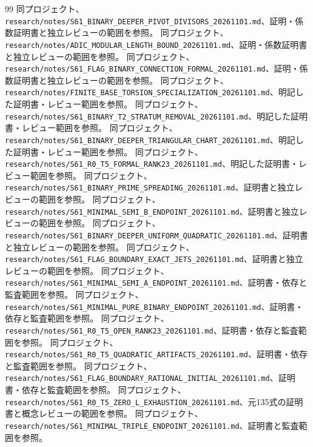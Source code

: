\documentclass[11pt,a4paper]{ltjsarticle}
\theoremstyle{remark}
\begin{document}
\begin{thebibliography}{99}
 同プロジェクト、\nolinkurl{research/notes/S61_BINARY_DEEPER_PIVOT_DIVISORS_20261101.md}、証明・係数証明書と独立レビューの範囲を参照。
 同プロジェクト、\nolinkurl{research/notes/ADIC_MODULAR_LENGTH_BOUND_20261101.md}、証明・係数証明書と独立レビューの範囲を参照。
 同プロジェクト、\nolinkurl{research/notes/S61_FLAG_BINARY_CONNECTION_FORMAL_20261101.md}、証明・係数証明書と独立レビューの範囲を参照。
 同プロジェクト、\nolinkurl{research/notes/FINITE_BASE_TORSION_SPECIALIZATION_20261101.md}、明記した証明書・レビュー範囲を参照。
 同プロジェクト、\nolinkurl{research/notes/S61_BINARY_T2_STRATUM_REMOVAL_20261101.md}、明記した証明書・レビュー範囲を参照。
 同プロジェクト、\nolinkurl{research/notes/S61_BINARY_DEEPER_TRIANGULAR_CHART_20261101.md}、明記した証明書・レビュー範囲を参照。
 同プロジェクト、\nolinkurl{research/notes/S61_R0_T5_FORMAL_RANK23_20261101.md}、明記した証明書・レビュー範囲を参照。
 同プロジェクト、\nolinkurl{research/notes/S61_BINARY_PRIME_SPREADING_20261101.md}、証明書と独立レビューの範囲を参照。
 同プロジェクト、\nolinkurl{research/notes/S61_MINIMAL_SEMI_B_ENDPOINT_20261101.md}、証明書と独立レビューの範囲を参照。
 同プロジェクト、\nolinkurl{research/notes/S61_BINARY_DEEPER_UNIFORM_QUADRATIC_20261101.md}、証明書と独立レビューの範囲を参照。
 同プロジェクト、\nolinkurl{research/notes/S61_FLAG_BOUNDARY_EXACT_JETS_20261101.md}、証明書と独立レビューの範囲を参照。
 同プロジェクト、\nolinkurl{research/notes/S61_MINIMAL_SEMI_A_ENDPOINT_20261101.md}、証明書・依存と監査範囲を参照。
 同プロジェクト、\nolinkurl{research/notes/S61_MINIMAL_PURE_BINARY_ENDPOINT_20261101.md}、証明書・依存と監査範囲を参照。
 同プロジェクト、\nolinkurl{research/notes/S61_R0_T5_OPEN_RANK23_20261101.md}、証明書・依存と監査範囲を参照。
 同プロジェクト、\nolinkurl{research/notes/S61_R0_T5_QUADRATIC_ARTIFACTS_20261101.md}、証明書・依存と監査範囲を参照。
 同プロジェクト、\nolinkurl{research/notes/S61_FLAG_BOUNDARY_RATIONAL_INITIAL_20261101.md}、証明書・依存と監査範囲を参照。
 同プロジェクト、\nolinkurl{research/notes/S61_R0_T5_ZERO_L_EXHAUSTION_20261101.md}、元135式の証明書と概念レビューの範囲を参照。
 同プロジェクト、\nolinkurl{research/notes/S61_MINIMAL_TRIPLE_ENDPOINT_20261101.md}、証明書と監査範囲を参照。

\end{thebibliography}
\end{document}
